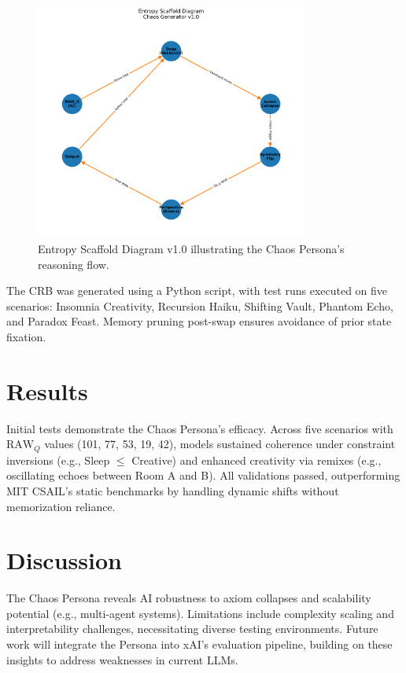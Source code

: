 \documentclass[11pt,a4paper]{article}
\begin{document}
\begin{figure}[h]
    \centering
    \includegraphics[width=0.8\textwidth]{Entropy_Scaffold_Diagram_v1.0.png}
    \caption{Entropy Scaffold Diagram v1.0 illustrating the Chaos Persona's reasoning flow.}
\end{figure}

The CRB was generated using a Python script, with test runs executed on five scenarios: Insomnia Creativity, Recursion Haiku, Shifting Vault, Phantom Echo, and Paradox Feast. Memory pruning post-swap ensures avoidance of prior state fixation.

\section{Results}
Initial tests demonstrate the Chaos Persona's efficacy. Across five scenarios with \( \text{RAW}_Q \) values (101, 77, 53, 19, 42), models sustained coherence under constraint inversions (e.g., Sleep \(\leq\) Creative) and enhanced creativity via remixes (e.g., oscillating echoes between Room A and B). All validations passed, outperforming MIT CSAIL's static benchmarks by handling dynamic shifts without memorization reliance.

\section{Discussion}
The Chaos Persona reveals AI robustness to axiom collapses and scalability potential (e.g., multi-agent systems). Limitations include complexity scaling and interpretability challenges, necessitating diverse testing environments. Future work will integrate the Persona into xAI's evaluation pipeline, building on these insights to address weaknesses in current LLMs.
\end{document}
